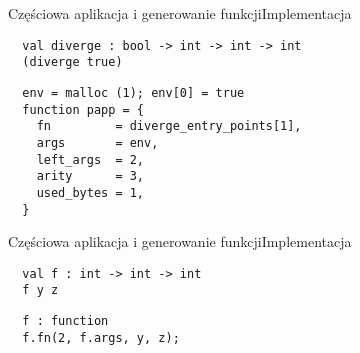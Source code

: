 \documentclass{beamer}
\begin{document}
\begin{frame}[fragile]{Częściowa aplikacja i generowanie funkcji}{Implementacja}
\begin{center}
\begin{minipage}{1.0\textwidth}
\begin{verbatim}
  val diverge : bool -> int -> int -> int
  (diverge true)
\end{verbatim}
\begin{verbatim}
  env = malloc (1); env[0] = true
  function papp = { 
    fn         = diverge_entry_points[1], 
    args       = env, 
    left_args  = 2, 
    arity      = 3, 
    used_bytes = 1,
  }
\end{verbatim}
\end{minipage}
\end{center}
\end{frame}

\begin{frame}[fragile]{Częściowa aplikacja i generowanie funkcji}{Implementacja}
\begin{center}
\begin{minipage}{1.0\textwidth}
\begin{verbatim}
  val f : int -> int -> int
  f y z
\end{verbatim}
\begin{verbatim}
  f : function  
  f.fn(2, f.args, y, z);
\end{verbatim}
\end{minipage}
\end{center}
\end{frame}
\end{document}
